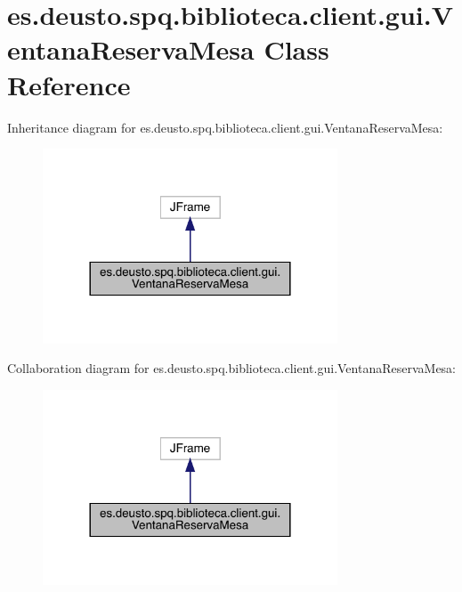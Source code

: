 \hypertarget{classes_1_1deusto_1_1spq_1_1biblioteca_1_1client_1_1gui_1_1_ventana_reserva_mesa}{}\section{es.\+deusto.\+spq.\+biblioteca.\+client.\+gui.\+Ventana\+Reserva\+Mesa Class Reference}
\label{classes_1_1deusto_1_1spq_1_1biblioteca_1_1client_1_1gui_1_1_ventana_reserva_mesa}


Inheritance diagram for es.\+deusto.\+spq.\+biblioteca.\+client.\+gui.\+Ventana\+Reserva\+Mesa\+:
\nopagebreak
\begin{figure}[H]
\begin{center}
\leavevmode
\includegraphics[width=248pt]{classes_1_1deusto_1_1spq_1_1biblioteca_1_1client_1_1gui_1_1_ventana_reserva_mesa__inherit__graph}
\end{center}
\end{figure}


Collaboration diagram for es.\+deusto.\+spq.\+biblioteca.\+client.\+gui.\+Ventana\+Reserva\+Mesa\+:
\nopagebreak
\begin{figure}[H]
\begin{center}
\leavevmode
\includegraphics[width=248pt]{classes_1_1deusto_1_1spq_1_1biblioteca_1_1client_1_1gui_1_1_ventana_reserva_mesa__coll__graph}
\end{center}
\end{figure}
